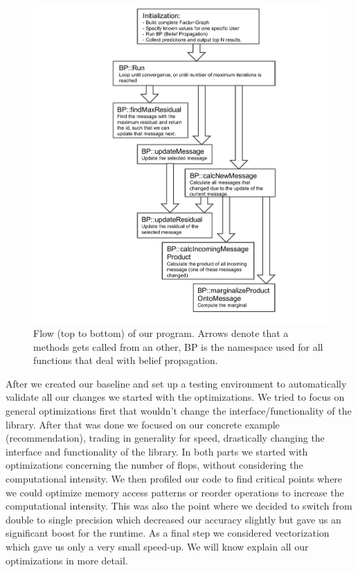 \begin{figure}\centering
    \includegraphics[scale=0.63, trim={6.5cm 0cm 0 0cm},clip]{graphics/loopybp.pdf}
  \caption{Flow (top to bottom) of our program. Arrows denote that a methods gets called from an other, BP is the namespace used for all functions that deal with belief propagation.\label{overviewflow}}
\end{figure}



After we created our baseline and set up a testing environment to automatically validate all our changes we started with the optimizations. We tried to focus on general optimizations first that wouldn't change the interface/functionality of the library. After that was done we focused on our concrete example (recommendation), trading in generality for speed, drastically changing the interface and functionality of the library. In both parts we started with optimizations concerning the number of flops, without considering the computational intensity. We then profiled our code to find critical points where we could optimize memory access patterns or reorder operations to increase the computational intensity. This was also the point where we decided to switch from double to single precision which decreased our accuracy slightly but gave us an significant boost for the runtime. %
As a final step we considered vectorization which gave us only a very small speed-up. We will know explain all our optimizations in more detail.
 
